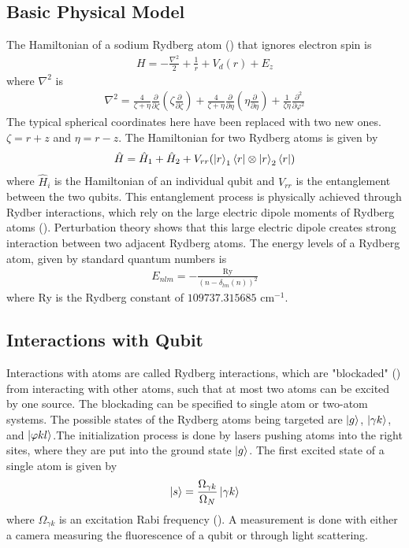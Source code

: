 \documentclass[10pt,letterpaper]{article}
\begin{document}
\subsection*{Basic Physical Model}
The Hamiltonian of a sodium Rydberg atom (\cite{Gallagher_1994}) that ignores electron spin is
\begin{gather*}
H = -\frac{\nabla^{2}}{2} + \frac{1}{r} + V_{d}(r) + E_{z}
\end{gather*}
where $\nabla^{2}$ is
\begin{gather*}
\nabla^{2} = \frac{4}{\zeta + \eta}\frac{\partial}{\partial \zeta}\left( \zeta \frac{\partial}{\partial \zeta} \right) + \frac{4}{\zeta + \eta}\frac{\partial}{\partial \eta} \left( \eta \frac{\partial}{\partial \eta} \right) + \frac{1}{\zeta\eta} \frac{\partial^{2}}{\partial \varphi^{2}}
\end{gather*}
The typical spherical coordinates here have been replaced with two new ones. $\zeta = r + z$ and $\eta = r - z$. The Hamiltonian for two Rydberg atoms is given by
\begin{gather*}
\hat{H} = \hat{H}_{1} + \hat{H}_{2} + V_{rr}(\ket{r}_{1}\bra{r} \otimes \ket{r}_{2}\bra{r})
\end{gather*}
where $\hat{H}_{i}$ is the Hamiltonian of an individual qubit and $V_{rr}$ is the entanglement between the two qubits. This entanglement process is physically achieved through Rydber interactions, which rely on the large electric dipole moments of Rydberg atoms (\cite{Henriet_2020}). Perturbation theory shows that this large electric dipole creates strong interaction between two adjacent Rydberg atoms. The energy levels of a Rydberg atom, given by standard quantum numbers is
\begin{gather*}
E_{nlm} = -\frac{\text{Ry}}{(n - \delta_{lm}(n))^{2}}
\end{gather*}
where Ry is the Rydberg constant of $109737.315685$ cm$^{-1}$. 

\subsection*{Interactions with Qubit}
Interactions with atoms are called Rydberg interactions, which are "blockaded" (\cite{Saffman_2010}) from interacting with other atoms, such that at most two atoms can be excited by one source. The blockading can be specified to single atom or two-atom systems. The possible states of the Rydberg atoms being targeted are $\ket{g}$, $\ket{\gamma k}$, and $\ket{\varphi kl}$.The initialization process is done by lasers
pushing atoms into the right sites, where they are put into the ground state $\ket{g}$. The first excited state of a single atom is given by
\begin{gather*}
\ket{s} = \frac{\Omega_{\gamma k}}{\Omega_{N}}\ket{\gamma k}
\end{gather*}
where $\Omega_{\gamma k}$ is an excitation Rabi frequency (\cite{Brennen_1999}). A measurement is done with either a camera measuring the fluorescence of a qubit or through light scattering. 



\end{document}
